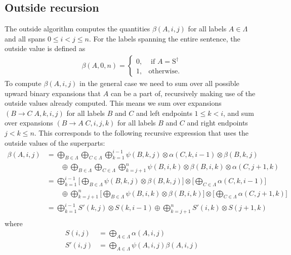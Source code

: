 \subsection{Outside recursion}
  The outside algorithm computes the quantities $\beta(A,i,j)$ for all labels $A \in \Lambda$ and all spans $0 \leq i < j \leq n$. For the labels spanning the entire sentence, the outside value is defined as
  \begin{align*}
    \beta(A, 0, n) =
    \begin{cases}
      0, & \text{ if } A = \text{S}^{\dagger}  \\
      1, & \text{otherwise}.
    \end{cases}
  \end{align*}
  To compute $\beta(A, i, j)$ in the general case we need to sum over all possible upward binary expansions that $A$ can be a part of, recursively making use of the outside values already computed. This means we sum over expansions $(B \to C \; A, k, i, j)$ for all labels $B$ and $C$ and left endpoints $1 \leq k < i$, and sum over expansions $(B \to A \; C, i, j, k)$ for all labels $B$ and $C$ and right endpoints $j < k \leq n$. This corresponds to the following recursive expression that uses the outside values of the superparts:
  \begin{align*}
    \beta(A, i, j)
      &= \bigoplus_{B \in \Lambda} \bigoplus_{C \in \Lambda} \bigoplus_{k=1}^{i-1} \psi(B, k, j) \otimes \alpha(C, k, i-1) \otimes \beta(B, k, j) \\
        &\qquad \oplus \bigoplus_{B \in \Lambda} \bigoplus_{C \in \Lambda} \bigoplus_{k=j+1}^{n} \psi(B, i, k) \otimes \beta(B, i, k) \otimes \alpha(C, j+1, k) \\
      &=  \bigoplus_{k=1}^{i-1}  \Bigg[ \bigoplus_{B \in \Lambda} \psi(B, k, j)  \otimes \beta(B, k, j) \Bigg] \otimes \Bigg[ \bigoplus_{C \in \Lambda} \alpha(C, k, i-1) \Bigg] \\
        &\qquad \oplus \bigoplus_{k=j+1}^{n}  \Bigg[ \bigoplus_{B \in \Lambda}  \psi(B, i, k) \otimes \beta(B, i, k) \Bigg] \otimes  \Bigg[  \bigoplus_{C \in \Lambda} \alpha(C, j+1, k) \Bigg] \\
      &=  \bigoplus_{k=1}^{i-1}  S'(k, j) \otimes S(k, i-1) \oplus \bigoplus_{k=j+1}^{n} S'(i, k) \otimes  S(j+1, k) \\
  \end{align*}
  where
  \begin{align*}
      S(i, j) &= \bigoplus_{A \in \Lambda} \alpha(A, i, j) \\
      S'(i, j) &= \bigoplus_{A \in \Lambda} \psi(A, i, j) \beta(A, i, j)
  \end{align*}


